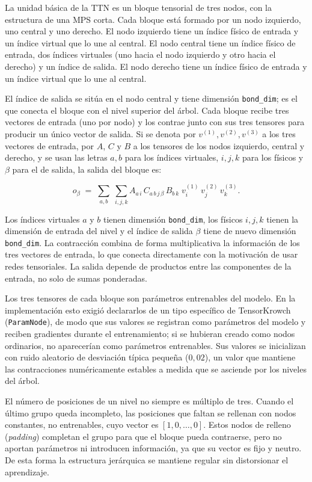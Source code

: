 La unidad básica de la TTN es un bloque tensorial de tres nodos, con la estructura de una MPS corta. Cada bloque está formado por un nodo izquierdo, uno central y uno derecho. El nodo izquierdo tiene un índice físico de entrada y un índice virtual que lo une al central. El nodo central tiene un índice físico de entrada, dos índices virtuales (uno hacia el nodo izquierdo y otro hacia el derecho) y un índice de salida. El nodo derecho tiene un índice físico de entrada y un índice virtual que lo une al central.

El índice de salida se sitúa en el nodo central y tiene dimensión \texttt{bond\_dim}; es el que conecta el bloque con el nivel superior del árbol. Cada bloque recibe tres vectores de entrada (uno por nodo) y los contrae junto con sus tres tensores para producir un único vector de salida. Si se denota por $v^{(1)}, v^{(2)}, v^{(3)}$ a los tres vectores de entrada, por $A$, $C$ y $B$ a los tensores de los nodos izquierdo, central y derecho, y se usan las letras $a,b$ para los índices virtuales, $i,j,k$ para los físicos y $\beta$ para el de salida, la salida del bloque es:

\begin{equation}
o_{\beta} \;=\; \sum_{a,b}\;\sum_{i,j,k} A_{a\,i}\, C_{a\,b\,j\,\beta}\, B_{b\,k}\; v^{(1)}_{i}\, v^{(2)}_{j}\, v^{(3)}_{k}.
\end{equation}

Los índices virtuales $a$ y $b$ tienen dimensión \texttt{bond\_dim}, los físicos $i,j,k$ tienen la dimensión de entrada del nivel y el índice de salida $\beta$ tiene de nuevo dimensión \texttt{bond\_dim}. La contracción combina de forma multiplicativa la información de los tres vectores de entrada, lo que conecta directamente con la motivación de usar redes tensoriales. La salida depende de productos entre las componentes de la entrada, no solo de sumas ponderadas.

Los tres tensores de cada bloque son parámetros entrenables del modelo. En la implementación esto exigió declararlos de un tipo específico de TensorKrowch (\texttt{ParamNode}), de modo que sus valores se registran como parámetros del modelo y reciben gradientes durante el entrenamiento; si se hubieran creado como nodos ordinarios, no aparecerían como parámetros entrenables. Sus valores se inicializan con ruido aleatorio de desviación típica pequeña ($0{,}02$), un valor que mantiene las contracciones numéricamente estables a medida que se asciende por los niveles del árbol.

El número de posiciones de un nivel no siempre es múltiplo de tres. Cuando el último grupo queda incompleto, las posiciones que faltan se rellenan con nodos constantes, no entrenables, cuyo vector es $[1, 0, \dots, 0]$. Estos nodos de relleno (\textit{padding}) completan el grupo para que el bloque pueda contraerse, pero no aportan parámetros ni introducen información, ya que su vector es fijo y neutro. De esta forma la estructura jerárquica se mantiene regular sin distorsionar el aprendizaje.

